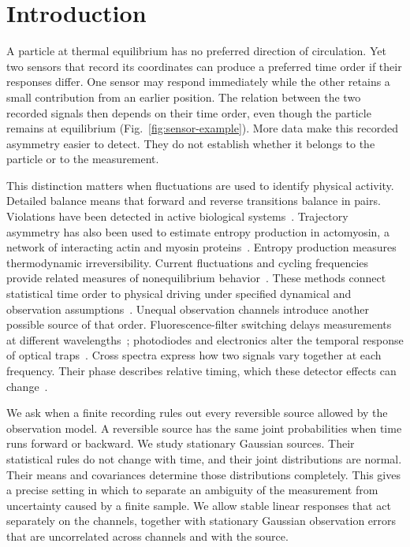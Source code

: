 \documentclass[aps,pre,reprint,floatfix,superscriptaddress,nofootinbib]{revtex4-2}
\begin{document}
\section{Introduction}
A particle at thermal equilibrium has no preferred direction of circulation. Yet two sensors that record its coordinates can produce a preferred time order if their responses differ. One sensor may respond immediately while the other retains a small contribution from an earlier position. The relation between the two recorded signals then depends on their time order, even though the particle remains at equilibrium (Fig.~\ref{fig:sensor-example}). More data make this recorded asymmetry easier to detect. They do not establish whether it belongs to the particle or to the measurement.

This distinction matters when fluctuations are used to identify physical activity. Detailed balance means that forward and reverse transitions balance in pairs. Violations have been detected in active biological systems~\cite{battle2016}. Trajectory asymmetry has also been used to estimate entropy production in actomyosin, a network of interacting actin and myosin proteins~\cite{seara2018}. Entropy production measures thermodynamic irreversibility. Current fluctuations and cycling frequencies provide related measures of nonequilibrium behavior~\cite{li2019,mura2018,gradziuk2019}. These methods connect statistical time order to physical driving under specified dynamical and observation assumptions~\cite{gonzalezarea2019,ohgaasymmetry2023,cerasolispectra2022,seara,gnesotto2018}. Unequal observation channels introduce another possible source of that order. Fluorescence-filter switching delays measurements at different wavelengths~\cite{stehbens2012}; photodiodes and electronics alter the temporal response of optical traps~\cite{bergsorensen2004}. Cross spectra express how two signals vary together at each frequency. Their phase describes relative timing, which these detector effects can change~\cite{tongzhang,bhandari2026}.

We ask when a finite recording rules out every reversible source allowed by the observation model. A reversible source has the same joint probabilities when time runs forward or backward. We study stationary Gaussian sources. Their statistical rules do not change with time, and their joint distributions are normal. Their means and covariances determine those distributions completely. This gives a precise setting in which to separate an ambiguity of the measurement from uncertainty caused by a finite sample. We allow stable linear responses that act separately on the channels, together with stationary Gaussian observation errors that are uncorrelated across channels and with the source.
\end{document}
